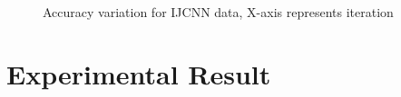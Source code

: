 \documentclass{article} %
\begin{document}
\begin{figure}
\caption{Accuracy variation for IJCNN data, X-axis represents iteration}
\label{fig:acc_ijcnn}
\end{figure}

\section{Experimental Result}
\end{document}
